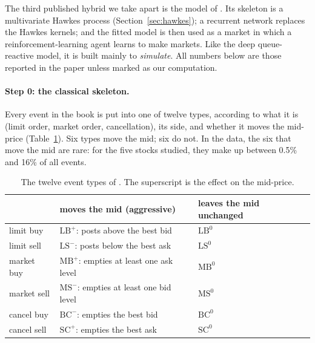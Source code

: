 The third published hybrid we take apart is the model of \citet{lalor2025nhp}. Its skeleton is a multivariate Hawkes process (Section~\ref{sec:hawkes}); a recurrent network
replaces the Hawkes kernels; and the fitted model is then used as a market in which a reinforcement-learning
agent learns to make markets. Like the deep queue-reactive model, it is built mainly to \emph{simulate}. All
numbers below are those reported in the paper unless marked as our computation.

\paragraph{Step 0: the classical skeleton.} Every event in the book is put into one of twelve types, according
to what it is (limit order, market order, cancellation), its side, and whether it moves the mid-price
(Table~\ref{tab:lalor-events}). Six types move the mid; six do not. In the data, the six that move the mid are
rare: for the five stocks studied, they make up between 0.5\% and 16\% of all events.

\begin{table}[!htbp]
\centering\footnotesize
\caption{The twelve event types of \citet{lalor2025nhp}. The superscript is the effect on the mid-price.}
\label{tab:lalor-events}
\begin{tabular}{lll}
\toprule
 & moves the mid (aggressive) & leaves the mid unchanged \\
\midrule
limit buy & $\text{LB}^{+}$: posts above the best bid & $\text{LB}^{0}$ \\
limit sell & $\text{LS}^{-}$: posts below the best ask & $\text{LS}^{0}$ \\
market buy & $\text{MB}^{+}$: empties at least one ask level & $\text{MB}^{0}$ \\
market sell & $\text{MS}^{-}$: empties at least one bid level & $\text{MS}^{0}$ \\
cancel buy & $\text{BC}^{-}$: empties the best bid & $\text{BC}^{0}$ \\
cancel sell & $\text{SC}^{+}$: empties the best ask & $\text{SC}^{0}$ \\
\bottomrule
\end{tabular}
\end{table}

